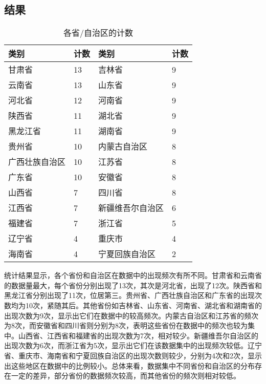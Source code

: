 \documentclass[AutoFakeBold]{LZUThesis-PgD&PhD}
\begin{document}
   		\subsection{结果}
   		\begin{table}[H]
   			\centering
   			\begin{tabular}{|l|l|l|l|}
   				\hline
   				\textbf{类别} & \textbf{计数} & \textbf{类别} & \textbf{计数} \\ \hline
   				甘肃省 & 13 & 吉林省 & 9 \\ \hline
   				云南省 & 13 & 山东省 & 9 \\ \hline
   				河北省 & 12 & 河南省 & 9 \\ \hline
   				陕西省 & 11 & 湖北省 & 9 \\ \hline
   				黑龙江省 & 11 & 湖南省 & 9 \\ \hline
   				贵州省 & 10 & 内蒙古自治区 & 8 \\ \hline
   				广西壮族自治区 & 10 & 江苏省 & 8 \\ \hline
   				广东省 & 10 & 安徽省 & 8 \\ \hline
   				山西省 & 7 & 四川省 & 8 \\ \hline
   				江西省 & 7 & 新疆维吾尔自治区 & 6 \\ \hline
   				福建省 & 7 & 浙江省 & 5 \\ \hline
   				辽宁省 & 4 & 重庆市 & 4 \\ \hline
   				海南省 & 4 & 宁夏回族自治区 & 2 \\ \hline
   			\end{tabular}
   			\caption{各省/自治区的计数}
   			\label{tab:category_count}
   		\end{table}
   		
   		统计结果显示，各个省份和自治区在数据中的出现频次有所不同。甘肃省和云南省的数据量最大，每个省份分别出现了13次，其次是河北省，出现了12次。陕西省和黑龙江省分别出现了11次，位居第三。贵州省、广西壮族自治区和广东省的出现次数均为10次，紧随其后。其他省份如吉林省、山东省、河南省、湖北省和湖南省的出现次数为9次，显示出它们在数据中的较高频次。内蒙古自治区和江苏省的频次为8次，而安徽省和四川省则分别为8次，表明这些省份在数据中的频次也较为集中。山西省、江西省和福建省的出现次数为7次，相对较少。新疆维吾尔自治区的出现次数为6次，而浙江省为5次，显示出它们在该数据集中的出现频次较低。辽宁省、重庆市、海南省和宁夏回族自治区的出现次数则较少，分别为4次和2次，显示出这些地区在数据中的比例较小。总体来看，数据集中不同省份和自治区的分布存在一定的差异，部分省份的数据频次较高，而其他省份的频次则相对较低。
   		
\end{document}
